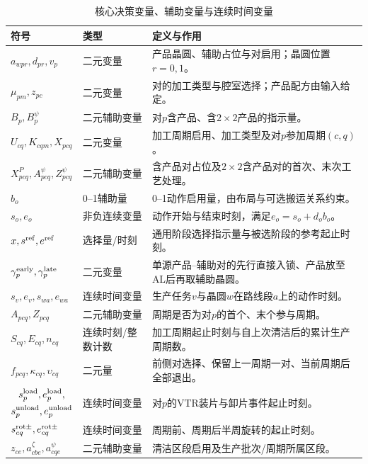 \documentclass[final,5p,times,twocolumn]{elsarticle}
\begin{document}
\begin{table}[t]
\centering
\scriptsize
\setlength{\tabcolsep}{3pt}
\caption{核心决策变量、辅助变量与连续时间变量}
\label{tab:symbol-cn-b}
\begin{tabular}{C{0.20\textwidth}C{0.16\textwidth}C{0.43\textwidth}}
\toprule
符号 & 类型 & 定义与作用 \\
\midrule
$a_{wpr},d_{pr},v_p$ & 二元变量 & 产品晶圆、辅助占位与对启用；晶圆位置$r=0,1$。\\
$\mu_{pm},z_{pc}$ & 二元变量 & 对的加工类型与腔室选择；产品配方由输入给定。\\
$B_p,B_p^{\psi}$ & 二元辅助变量 & 对$p$含产品、含$2\times2$产品的指示量。\\
$U_{cq},K_{cqm},X_{pcq}$ & 二元变量 & 加工周期启用、加工类型及对$p$参加周期$(c,q)$。\\
$X^P_{pcq},A^{\psi}_{pcq},Z^{\psi}_{pcq}$ & 二元辅助变量 & 含产品对占位及$2\times2$含产品对的首次、末次工艺处理。\\
$b_o$ & 0--1辅助量 & 0--1动作启用量，由布局与可选搬运关系约束。\\
$s_o,e_o$ & 非负连续变量 & 动作开始与结束时刻，满足$e_o=s_o+d_ob_o$。\\
$x,s^{\rm ref},e^{\rm ref}$ & 选择量/时刻 & 通用阶段选择指示量与被选阶段的参考起止时刻。\\
$\gamma^{\rm early}_p,\gamma^{\rm late}_p$ & 二元变量 & 单源产品--辅助对的先行直接入锁、产品放至AL后再取辅助晶圆。\\
$s_v,e_v,s_{wa},e_{wa}$ & 连续时间变量 & 生产任务$v$与晶圆$w$在路线段$a$上的动作时刻。\\
$A_{pcq},Z_{pcq}$ & 二元辅助变量 & 周期是否为对$p$的首个、末个参与周期。\\
$S_{cq},E_{cq},n_{cq}$ & 连续时刻/整数计数 & 加工周期起止时刻与自上次清洁后的累计生产周期数。\\
$f_{pcq},\kappa_{cq},\upsilon_{cq}$ & 二元量 & 前侧对选择、保留上一周期一对、当前周期后全部退出。\\
$\begin{gathered}s^{\rm load}_p,e^{\rm load}_p,\\s^{\rm unload}_p,e^{\rm unload}_p\end{gathered}$ & 连续时间变量 & 对$p$的VTR装片与卸片事件起止时刻。\\
$s^{\rm rot\pm}_{cq},e^{\rm rot\pm}_{cq}$ & 连续时间变量 & 周期前、周期后半周旋转的起止时刻。\\
$z_{ce},a^{\zeta}_{cbe},a^{\psi}_{cqe}$ & 二元辅助变量 & 清洁区段启用及生产批次/周期所属区段。\\

\end{tabular}
\end{table}
\end{document}
